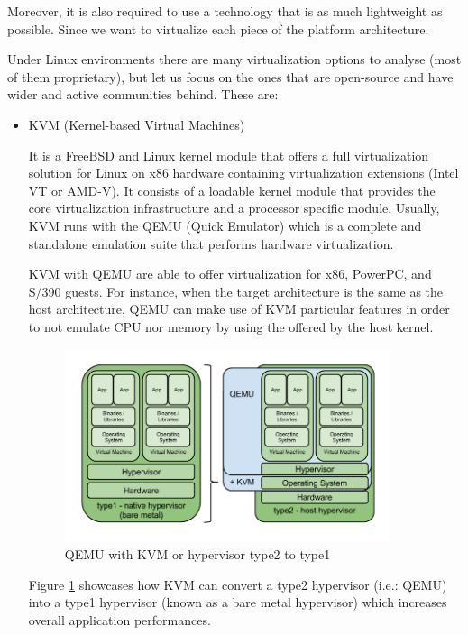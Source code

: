 Moreover, it is also required to use a technology that is as much lightweight as possible. Since we want to virtualize each piece of the platform architecture.

Under Linux environments there are many virtualization options to analyse (most of them proprietary), but let us focus on the ones that are open-source and have wider and active communities behind. These are:

\begin{itemize}
\item KVM (Kernel-based Virtual Machines) \cite{kvm}\hfill

It is a FreeBSD and Linux kernel module that offers a full virtualization solution for Linux on x86 hardware containing virtualization extensions (Intel VT or AMD-V). It consists of a loadable kernel module that provides the core virtualization infrastructure and a processor specific module.
Usually, KVM runs with the QEMU (Quick Emulator) \cite{qemu} which is a complete and standalone emulation suite that performs hardware virtualization.

KVM with QEMU are able to offer virtualization for x86, PowerPC, and S/390 guests. For instance, when the target architecture is the same as the host architecture, QEMU can make use of KVM particular features in order to not emulate CPU nor memory by using the offered by the host kernel.

\begin{figure}[!htb]
\begin{center}
\includegraphics[width=0.9\textwidth]{./images/KVM.png}
\caption{QEMU with KVM or hypervisor type2 to type1}
\label{F:KVMandQEMU}
\end{center}
\end{figure}

Figure \ref{F:KVMandQEMU} showcases how KVM can convert a type2 hypervisor (i.e.: QEMU) into a type1 hypervisor (known as a bare metal hypervisor) which increases overall application performances. 


\end{itemize}
